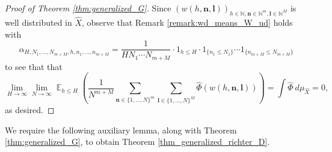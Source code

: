 \documentclass[12pt]{article}
\theoremstyle{plain} %
\theoremstyle{definition} %
\theoremstyle{plain}
\theoremstyle{plain}
\numberwithin{equation}{section}
\newcommand{\N}{\mathbb{N}}
\renewcommand{\leq}{\leqslant}
\newcommand{\1}{\mathbbm{1}}
\newcommand{\E}{\operatorname{\mathbb{E}}}
\newcommand{\oo}{\infty}
\begin{document}
\begin{proof}[Proof of Theorem \ref{thm:generalized_G}]
 Since $(w(h,\mathbf{n}, \mathbf{l}))_{h\in \N,\mathbf{n}\in \N^{m},\mathbf{l}\in \N^{M}}$ is well distributed in $\widehat{X}$, observe that Remark \ref{remark:wd_means_W_ud} holds with 
 $$
 \alpha_{H,N_1,\dots, N_{m+M},h,n_1,\dots, n_{m+M}} = \frac{1}{HN_1\cdots  N_{m+M}}\cdot 1_{h\leq H}\cdot 1_{\{n_1\leq N_1\}}\cdots 1_{\{n_{m+M}\leq N_{m+M}\}}
 $$
 to see that that
 \begin{equation}
     \lim_{H\to\oo}\lim_{N\to\oo}\E_{h\leq H}\left(\frac{1}{N^{m+M}}\sum_{\mathbf{n}\in\{1,\dots, N\}^{m}}\sum_{\mathbf{l}\in\{1,\dots, N\}^M}\widehat{\Phi}(w(h,\mathbf{n}, \mathbf{l}))\right) = \int \widehat{\Phi}~d\mu_{\widehat{X}}= 0,
 \end{equation}
 as desired.
 \end{proof}

 
 We require the following auxiliary lemma, along with Theorem \ref{thm:generalized_G}, to obtain Theorem \ref{thm_generalized_richter_D}.
 
\end{document}
